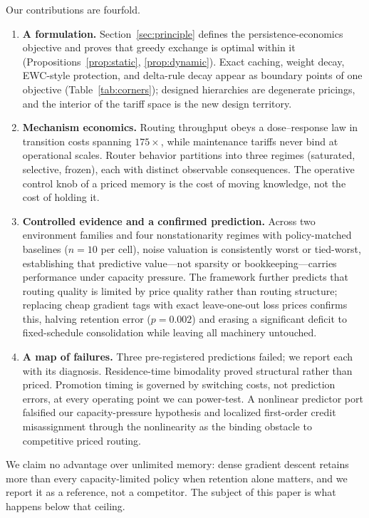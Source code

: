 \documentclass[11pt]{article}
\begin{document}
Our contributions are fourfold.
\begin{enumerate}
\item \textbf{A formulation.} Section~\ref{sec:principle} defines the persistence-economics objective
and proves that greedy exchange is optimal within it (Propositions~\ref{prop:static},
\ref{prop:dynamic}). Exact caching, weight decay, EWC-style protection, and delta-rule decay appear as
boundary points of one objective (Table~\ref{tab:corners}); designed hierarchies are degenerate
pricings, and the interior of the tariff space is the new design territory.
\item \textbf{Mechanism economics.} Routing throughput obeys a dose--response law in transition costs
spanning $175\times$, while maintenance tariffs never bind at operational scales. Router behavior
partitions into three regimes (saturated, selective, frozen), each with distinct observable
consequences. The operative control knob of a priced memory is the cost of moving knowledge, not the
cost of holding it.
\item \textbf{Controlled evidence and a confirmed prediction.} Across two environment families and
four nonstationarity regimes with policy-matched baselines ($n=10$ per cell), noise valuation is
consistently worst or tied-worst, establishing that predictive value---not sparsity or
bookkeeping---carries performance under capacity pressure. The framework further predicts that routing
quality is limited by price quality rather than routing structure; replacing cheap gradient tags with
exact leave-one-out loss prices confirms this, halving retention error ($p=0.002$) and erasing a
significant deficit to fixed-schedule consolidation while leaving all machinery untouched.
\item \textbf{A map of failures.} Three pre-registered predictions failed; we report each with its
diagnosis. Residence-time bimodality proved structural rather than priced. Promotion timing is governed
by switching costs, not prediction errors, at every operating point we can power-test. A nonlinear
predictor port falsified our capacity-pressure hypothesis and localized first-order credit
misassignment through the nonlinearity as the binding obstacle to competitive priced routing.
\end{enumerate}

We claim no advantage over unlimited memory: dense gradient descent retains more than every
capacity-limited policy when retention alone matters, and we report it as a reference, not a competitor.
The subject of this paper is what happens below that ceiling.
\end{document}
